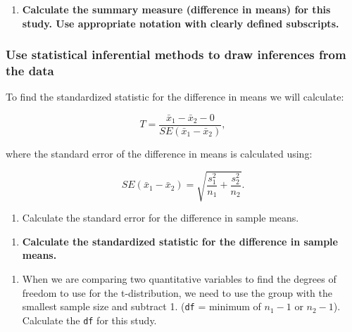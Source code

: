 \documentclass[
]{report}
\providecommand{\tightlist}{%
  \setlength{\itemsep}{0pt}\setlength{\parskip}{0pt}}
\begin{document}
\begin{enumerate}
\def\labelenumi{\arabic{enumi}.}
\setcounter{enumi}{5}
\tightlist
\item
  \textbf{Calculate the summary measure (difference in means) for this study. Use appropriate notation with clearly defined subscripts.}
\end{enumerate}

\vspace{1in}

\subsubsection*{Use statistical inferential methods to draw inferences from the data}\label{use-statistical-inferential-methods-to-draw-inferences-from-the-data-7}

To find the standardized statistic for the difference in means we will calculate:

\[T = \frac{\bar{x}_1-\bar{x}_2 -0}{SE(\bar{x}_1-\bar{x}_2)},\]

where the standard error of the difference in means is calculated using:

\[SE(\bar{x}_1 -\bar{x}_2)=\sqrt{\frac{s_1^2}{n_1}+\frac{s_2^2}{n_2}}.\]

\begin{enumerate}
\def\labelenumi{\arabic{enumi}.}
\setcounter{enumi}{6}
\tightlist
\item
  Calculate the standard error for the difference in sample means.
\end{enumerate}

\vspace{0.5in}

\begin{enumerate}
\def\labelenumi{\arabic{enumi}.}
\setcounter{enumi}{7}
\tightlist
\item
  \textbf{Calculate the standardized statistic for the difference in sample means.}
\end{enumerate}

\vspace{0.5in}

\begin{enumerate}
\def\labelenumi{\arabic{enumi}.}
\setcounter{enumi}{8}
\tightlist
\item
  When we are comparing two quantitative variables to find the degrees of freedom to use for the t-distribution, we need to use the group with the smallest sample size and subtract 1. (\texttt{df} = minimum of \(n_1 - 1\) or \(n_2 - 1\)). Calculate the \texttt{df} for this study.
\end{enumerate}
\end{document}

